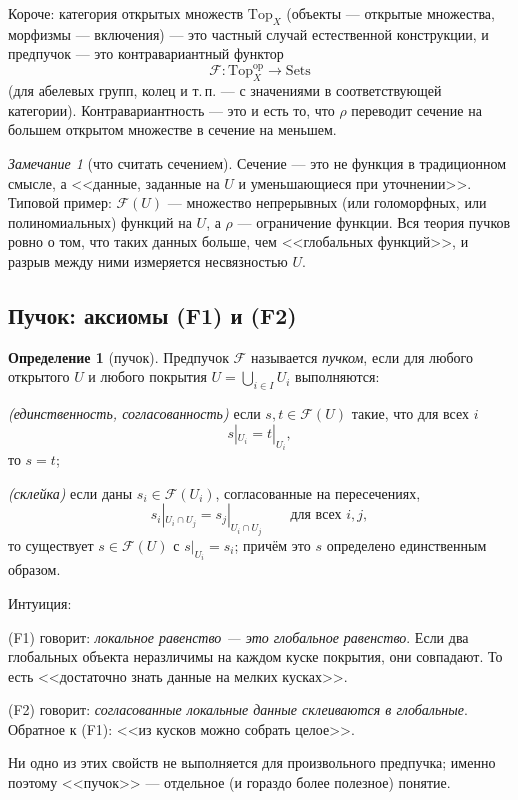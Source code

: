 \documentclass[11pt,b5paper]{article}
\newcommand{\Shv}[1]{\mathscr{#1}}   %
\newcommand{\Top}{\mathrm{Top}}
\theoremstyle{plain}
\theoremstyle{definition}
\newtheorem{defninner}[thminner]{Определение}
\theoremstyle{remark}
\newtheorem{reminner}[thminner]{Замечание}
\newcommand{\thmbeg}{%
  \par\smallskip
  \begin{lrbox}{\thmbox}%
  \begin{minipage}{\linewidth}}
\newcommand{\thmend}{%
  \end{minipage}%
  \end{lrbox}%
  \noindent\usebox{\thmbox}%
  \par\smallskip}
\newenvironment{defn}{\thmbeg\begin{defninner}}{\end{defninner}\thmend}
\newenvironment{rem}{\thmbeg\begin{reminner}}{\end{reminner}\thmend}
\let\brutsubsection\subsection
\renewcommand{\subsection}{\Needspace{5\baselineskip}\brutsubsection}
\begin{document}
Короче: категория открытых множеств $\Top_X$ (объекты --- открытые
множества, морфизмы --- включения) --- это частный случай естественной
конструкции, и предпучок --- это контравариантный функтор
\[
  \Shv{F}\colon\Top_X^{\mathrm{op}}\longrightarrow \mathrm{Sets}
\]
(для абелевых групп, колец и т.\,п. --- с значениями в соответствующей
категории). Контравариантность --- это и есть то, что $\rho$ переводит
сечение на большем открытом множестве в сечение на меньшем.

\begin{rem}[что считать сечением]
Сечение --- это не функция в традиционном смысле, а <<данные, заданные
на $U$ и уменьшающиеся при уточнении>>. Типовой пример:
$\Shv{F}(U)$ --- множество непрерывных (или голоморфных, или
полиномиальных) функций на $U$, а $\rho$ --- ограничение функции.
Вся теория пучков ровно о том, что таких данных больше, чем
<<глобальных функций>>, и разрыв между ними измеряется
несвязностью $U$.
\end{rem}

\subsection{Пучок: аксиомы (F1) и (F2)}
\leavevmode\par
\begin{defn}[пучок]
Предпучок $\Shv{F}$ называется \emph{пучком}, если для любого открытого
$U$ и любого покрытия $U=\bigcup_{i\in I}U_i$ выполняются:
\begin{bullets}
\item[\textup{(F1)}] \emph{(единственность, согласованность)} если
 $s,t\in\Shv{F}(U)$ такие, что для всех $i$
 \[
   s|_{U_i}=t|_{U_i},
 \]
 то $s=t$;
\item[\textup{(F2)}] \emph{(склейка)} если даны $s_i\in\Shv{F}(U_i)$,
 согласованные на пересечениях,
 \[
   s_i|_{U_i\cap U_j}=s_j|_{U_i\cap U_j}\qquad\text{для всех }i,j,
 \]
 то существует $s\in\Shv{F}(U)$ с $s|_{U_i}=s_i$; причём это $s$
 определено единственным образом.
\end{bullets}
\end{defn}

Интуиция:
\begin{bullets}
\item (F1) говорит: \emph{локальное равенство --- это глобальное
 равенство}. Если два глобальных объекта неразличимы на каждом куске
 покрытия, они совпадают. То есть <<достаточно знать данные на мелких
 кусках>>.
\item (F2) говорит: \emph{согласованные локальные данные склеиваются в
 глобальные}. Обратное к (F1): <<из кусков можно собрать целое>>.
\end{bullets}
Ни одно из этих свойств не выполняется для произвольного предпучка;
именно поэтому <<пучок>> --- отдельное (и гораздо более полезное)
понятие.
\end{document}
